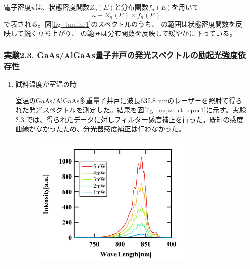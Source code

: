 \documentclass[11pt,a4j]{jsarticle}
\newlength{\circleboxwdht}
\newcommand{\centercircle}[1]{%
  \setlength{\circleboxwdht}{\wd\circlebox}%
  \addtolength{\circleboxwdht}{\dp\circlebox}%
  \raisebox{0.4\dp\circlebox}{%
    \parbox[][\circleboxwdht][c]{\wd\circlebox}{\centering#1}}%
  \llap{\usebox{\circlebox}}%
}	%
\begin{document}
電子密度$n$は、状態密度関数$Z_{n}(E)$と分布関数$f_{n}(E)$を用いて
\begin{equation}
 n=Z_{n}(E)\times f_{n}(E)
 \label{eq_spectrum}
\end{equation}
で表される。図\ref{fig_lumine1}のスペクトルのうち、\centercircle{1}の範囲は状態密度関数を反映して鋭く立ち上がり、\centercircle{2}の範囲は分布関数を反映して緩やかに下っている。

\newpage
\subsubsection{実験2.3. GaAs/AlGaAs量子井戸の発光スペクトルの励起光強度依存性}

\begin{enumerate}%
 \item 試料温度が室温の時

       室温のGaAs/AlGaAs多重量子井戸に波長632.8 nmのレーザーを照射て得られた発光スペクトルを測定した。結果を図\ref{fig_mqw_rt_spec1}に示す。実験2.3.では、得られたデータに対しフィルター感度補正を行った。既知の感度曲線がなかったため、分光器感度補正は行わなかった。

       \begin{figure}[ht]
        \centering
        \begin{tabular}{c}

         \begin{minipage}{0.52\hsize}

          \includegraphics[clip,width=8cm]{start2_MQW_rt_Spectrum_wav.jpg}
         \end{minipage}


\end{tabular}
\end{figure}
\end{enumerate}
\end{document}

